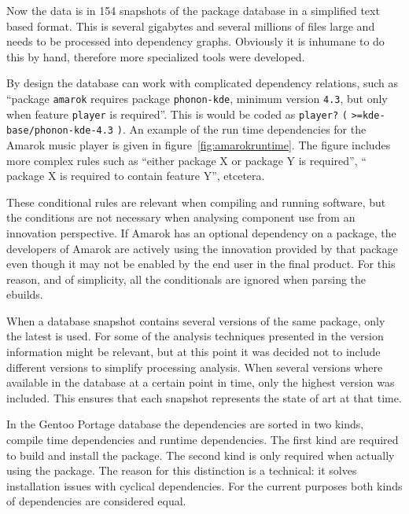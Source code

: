 \documentclass[smallextended,final]{svjour3}
\begin{document}
Now the data is in 154 snapshots of the package database in a simplified text based format. This is several gigabytes and several millions of files large and needs to be processed into dependency graphs. Obviously it is inhumane to do this by hand, therefore more specialized tools were developed.

By design the database can work with complicated dependency relations, such as ``package \verb|amarok| requires package \verb|phonon-kde|, minimum version \verb|4.3|, but only when feature \verb|player| is required''. This is would be coded as \verb|player?| \verb|(| \verb|>=kde-base/phonon-kde-4.3| \verb|)|. An example of the run time dependencies for the Amarok music player is given in figure~\ref{fig:amarokruntime}. The figure includes more complex rules such as ``either package X or package Y is required'', `` package X is required to contain feature Y'', etcetera.

These conditional rules are relevant when compiling and running software, but the conditions are not necessary when analysing component use from an innovation perspective. If Amarok has an optional dependency on a package, the developers of Amarok are actively using the innovation provided by that package even though it may not be enabled by the end user in the final product. For this reason, and of simplicity, all the conditionals are ignored when parsing the ebuilds.

When a database snapshot contains several versions of the same package, only the latest is used. For some of the analysis techniques presented in the version information might be relevant, but at this point it was decided not to include different versions to simplify processing analysis. When several versions where available in the database at a certain point in time, only the highest version was included. This ensures that each snapshot represents the state of art at that time.

In the Gentoo Portage database the dependencies are sorted in two kinds, compile time dependencies and runtime dependencies. The first kind are required to build and install the package. The second kind is only required when actually using the package. The reason for this distinction is a technical: it solves installation issues with cyclical dependencies. For the current purposes both kinds of dependencies are considered equal.
\end{document}
